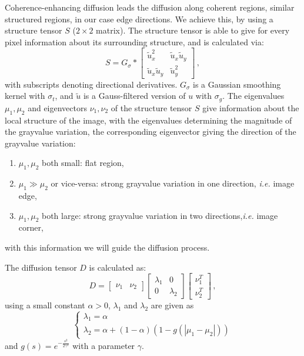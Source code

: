 Coherence-enhancing diffusion leads the diffusion along coherent regions, similar structured regions, in our case edge directions. We achieve this, by using a structure tensor $S$ ($2 \times 2$ matrix). The structure tensor is able to give for every pixel information about its surrounding structure, and is calculated via:
\begin{equation}
S=G_\sigma *
\begin{bmatrix}
    \tilde{u}^2_x       & \tilde{u}_x \tilde{u}_y   \\
   \tilde{u}_x \tilde{u}_y & \tilde{u}^2_y
\end{bmatrix}\,,
\label{eq:PM_S}
\end{equation}
with subscripts denoting directional derivatives. $G_\sigma$ is a Gaussian smoothing kernel with $\sigma_t$, and $\tilde{u}$ is a Gauss-filtered version of $u$ with $\sigma_g$. The eigenvalues $\mu_1 , \mu_2$ and eigenvectors $\nu_1 , \nu_2$ of the structure tensor $S$ give information about the local structure of the image, with the eigenvalues determining the magnitude of the grayvalue variation, the corresponding eigenvector giving the direction of the grayvalue variation:
\begin{enumerate}
\item $\mu_1 , \mu_2$ both small: flat region,

\item $\mu_1 \gg \mu_2$ or vice-versa: strong grayvalue variation in one direction, \textit{i.e.} image edge,
\label{enum:PM_b}

\item $\mu_1 , \mu_2$ both large: strong grayvalue variation in two directions,\textit{i.e.} image corner,
\end{enumerate}
with this information we will guide the diffusion process.

The diffusion tensor $D$ is calculated as:
\begin{equation}
D=\begin{bmatrix}
    \nu_1 & \nu_2
   \end{bmatrix}   
\begin{bmatrix}
    \lambda_1       & 0  \\
   0 & \lambda_2
\end{bmatrix}
\begin{bmatrix}
    \nu_1^T \\ \nu_2^T
   \end{bmatrix}\,,
\label{eq:PM_D}
\end{equation}
using a small constant $\alpha > 0$, $\lambda_1$ and $\lambda_2$ are given as
\begin{equation}
\begin{cases}
     \lambda_1=\alpha\\
     \lambda_2=\alpha + (1-\alpha)(1-g(|\mu_1-\mu_2|))   \end{cases}
\end{equation}
and $g(s)=e^{-\frac{s^2}{2\gamma^2}}$ with a parameter $\gamma$.

